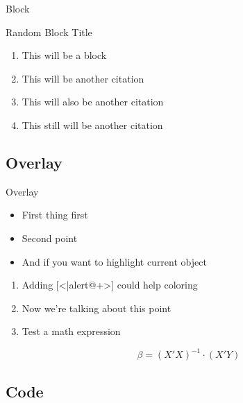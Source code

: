 \documentclass[pdf]{beamer}
\begin{document}
\begin{frame}{Block}
    
    \begin{block}{Random Block Title}
    \begin{enumerate}

    \item This will be a block \cite{10.1257/aer.20200451}
    \item This will be another citation \cite{10.1257/aer.20190553}
    \item This will also be another citation \cite{Adler:1998:MDL}
    \item This still will be another citation \cite{doi:https://doi.org/10.1002/9780470756461.ch5}
     \end{enumerate}
    \end{block}
    
\end{frame}

\subsection{Overlay}

\begin{frame}{Overlay}

    \begin{itemize}[<+->]
        \item First thing first
        \item Second point 
        \item And if you want to highlight current object
    \end{itemize}
    
    \begin{enumerate}[<+-|alert@+>]
        \item Adding [<|alert@+>] could help coloring
        \item Now we're talking about this point
        \item Test a math expression
        
        \begin{equation*}
            \beta = (X'X)^{-1} \cdot (X'Y)
        \end{equation*}
        
    \end{enumerate}
    
    
\end{frame}

\subsection{Code}
\end{document}
